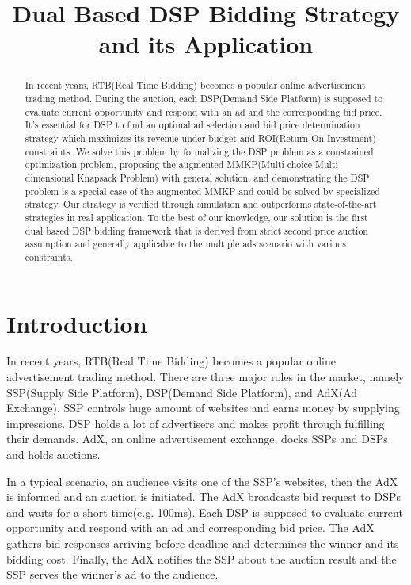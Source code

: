 \documentclass{article}
\title{Dual Based DSP Bidding Strategy and its Application}
\begin{document}
\maketitle

\begin{abstract}
In recent years, RTB(Real Time Bidding) becomes a popular online advertisement trading method.
During the auction, each DSP(Demand Side Platform) is supposed to
    evaluate current opportunity and respond with an ad and the corresponding bid price.
It's essential for DSP to find an optimal ad selection and bid price determination strategy
    which maximizes its revenue under budget and ROI(Return On Investment) constraints.
We solve this problem by
    formalizing the DSP problem as a constrained optimization problem,
    proposing the augmented MMKP(Multi-choice Multi-dimensional Knapsack Problem) with general solution,
    and demonstrating the DSP problem is a special case of the augmented MMKP and could be solved by specialized strategy.
Our strategy is verified through simulation and outperforms state-of-the-art strategies in real application.
To the best of our knowledge, our solution is the first dual based DSP bidding framework
    that is derived from strict second price auction assumption and
    generally applicable to the multiple ads scenario with various constraints.
\end{abstract}


\section{Introduction} \label{Introduction}

In recent years, RTB(Real Time Bidding) becomes a popular online advertisement trading method.
There are three major roles in the market, namely SSP(Supply Side Platform), DSP(Demand Side Platform), and AdX(Ad Exchange).
SSP controls huge amount of websites and earns money by supplying impressions.
DSP holds a lot of advertisers and makes profit through fulfilling their demands.
AdX, an online advertisement exchange, docks SSPs and DSPs and holds auctions.

In a typical scenario, an audience visits one of the SSP's websites, then the AdX is informed and an auction is initiated.
The AdX broadcasts bid request to DSPs and waits for a short time(e.g. 100ms).
Each DSP is supposed to evaluate current opportunity and respond with an ad and corresponding bid price.
The AdX gathers bid responses arriving before deadline and determines the winner and its bidding cost.
Finally, the AdX notifies the SSP about the auction result and the SSP serves the winner's ad to the audience.
\end{document}
